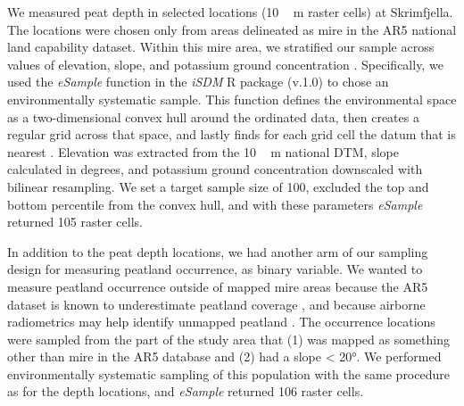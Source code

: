 \documentclass[soil, manuscript]{copernicus}
\begin{document}
We measured peat depth in selected locations (\unit{10\,m} raster cells) at Skrimfjella.
The locations were chosen only from areas delineated as mire in the AR5 national land capability dataset.
Within this mire area, we stratified our sample across values of elevation, slope, and potassium ground concentration \citep[from processed airborne gamma ray spectrometry,][]{baranwalHelicopterborneMagneticElectromagnetic2013}.
Specifically, we used the \emph{eSample} function in the \emph{iSDM} R package (v.1.0) to chose an environmentally systematic sample.
This function defines the environmental space as a two-dimensional convex hull around the ordinated data, then creates a regular grid across that space, and lastly finds for each grid cell the datum that is nearest \citep{hattabUnifiedFrameworkModel2017}.
Elevation was extracted from the \unit{10\,m} national DTM, slope calculated in degrees, and potassium ground concentration downscaled with bilinear resampling.
We set a target sample size of 100, excluded the top and bottom percentile from the convex hull, and with these parameters \emph{eSample} returned 105 raster cells.

In addition to the peat depth locations, we had another arm of our sampling design for measuring peatland occurrence, as binary variable.
We wanted to measure peatland occurrence outside of mapped mire areas because the AR5 dataset is known to underestimate peatland coverage \citep[especially in forests,][]{brynLandCoverNorway2018}, and because airborne radiometrics may help identify unmapped peatland \citep{gatisMappingUplandPeat2019, olearyDigitalSoilMapping2022}.
The occurrence locations were sampled from the part of the study area that (1) was mapped as something other than mire in the AR5 database and (2) had a slope \textless{} 20°.
We performed environmentally systematic sampling of this population with the same procedure as for the depth locations, and \emph{eSample} returned 106 raster cells.
\end{document}
